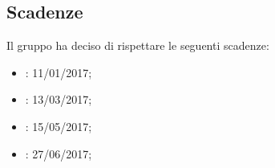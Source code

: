 \subsection{Scadenze}
Il gruppo \gruppo ha deciso di rispettare le seguenti scadenze:
\begin{itemize}
	\item \textbf{\RR}: 11/01/2017;
	\item \textbf{\RP}: 13/03/2017;
	\item \textbf{\RQ}: 15/05/2017;
	\item \textbf{\RA}: 27/06/2017;
\end{itemize}